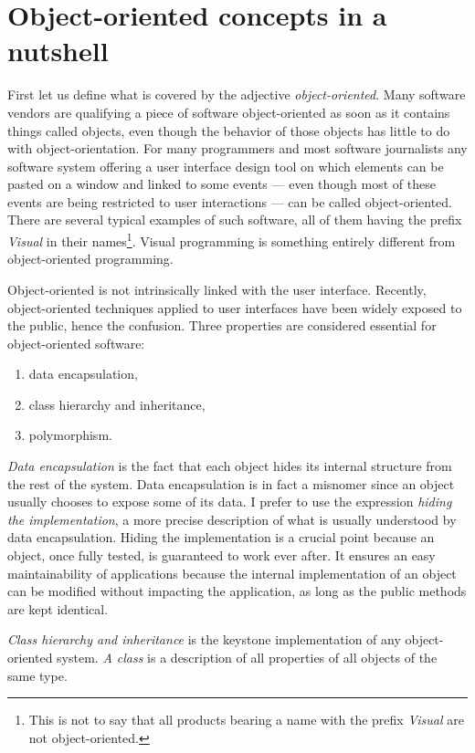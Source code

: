 \documentclass[twoside]{book}
\begin{document}
\section{Object-oriented concepts in a nutshell}
First let us define what is covered by the adjective {\it
object-oriented}. Many software vendors are qualifying a piece of
software object-oriented as soon as it contains things called
objects, even though the behavior of those objects has little to
do with object-orientation. For many programmers and most software
journalists any software system offering a user interface design
tool on which elements can be pasted on a window and linked to
some events --- even though most of these events are being
restricted to user interactions --- can be called object-oriented.
There are several typical examples of such software, all of them
having the prefix {\it Visual} in their names\footnote{This is not
to say that all products bearing a name with the prefix {\it
Visual} are not object-oriented.}. Visual programming is something
entirely different from object-oriented programming.
\par
Object-oriented is not intrinsically linked
with the user interface. Recently, object-oriented techniques
applied to user interfaces have been widely exposed to the public,
hence the confusion. Three properties are considered
essential for object-oriented software:
\begin{enumerate}
\item data encapsulation,
\item class hierarchy and inheritance,
\item polymorphism.
\end{enumerate}
{\it Data encapsulation} is the fact that each object hides its
internal structure from the rest of the system. Data encapsulation
is in fact a misnomer since an object usually chooses to expose
some of its data. I prefer to use the expression {\it hiding the
implementation}, a more precise description of what is usually
understood by data encapsulation. Hiding the implementation is a
crucial point because an object, once fully tested, is guaranteed
to work ever after. It ensures an easy maintainability of
applications because the internal implementation of an object can
be modified without impacting the application, as long as the
public methods are kept identical.
\par
{\it Class hierarchy and inheritance} is the keystone
implementation of any object-oriented system. {\it A class} is a
description of all properties of all objects of the same type.
\end{document}

